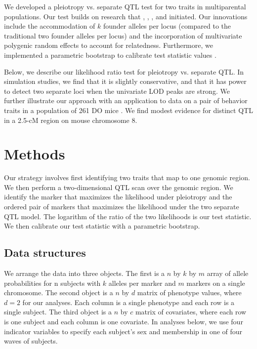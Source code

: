 \documentclass[12pt,twoside, lineno]{gsajnl}
\begin{document}
We developed a pleiotropy vs. separate QTL test for two traits in multiparental populations. Our test builds on research that \citet{jiang1995multiple}, \citet{knott2000multitrait}, \citet{tian2016dissection}, and \citet{zhou2014efficient} initiated. Our innovations include the accommodation of $k$ founder alleles per locus (compared to the traditional two founder alleles per locus) and the incorporation of multivariate polygenic random effects to account for relatedness. Furthermore, we implemented a parametric bootstrap to calibrate test statistic values \citep{efron1979,tian2016dissection}.

Below, we describe our likelihood ratio test for pleiotropy vs.
separate QTL. In simulation studies, we find that it is slightly
conservative, and that it has power to detect two separate loci when
the univariate LOD peaks are strong. We further illustrate our
approach with an application to data on a pair of behavior traits in
a population of 261 DO mice \citep{logan2013high,recla2014precise}.
We find modest evidence for distinct QTL in a 2.5-cM region on mouse
chromosome 8.


\section{Methods}
\label{sec:materials:methods}

Our strategy involves first identifying two traits that map to one genomic region. We then perform a two-dimensional QTL scan over the genomic region. We identify the marker that maximizes the likelihood under pleiotropy and the ordered pair of markers that maximizes the likelihood under the two separate QTL model. The logarithm of the ratio of the two likelihoods is our test statistic. We then calibrate our test statistic with a parametric bootstrap.

\subsection{Data structures}

We arrange the data into three objects. The first is a $n$ by $k$ by $m$ array of allele probabilities for n subjects with $k$ alleles per marker and $m$ markers on a single chromosome. The second object is a $n$ by $d$ matrix of phenotype values, where $d = 2$ for our analyses. Each column is a single phenotype and each row is a single subject. The third object is a $n$ by $c$ matrix of covariates, where each row is one subject and each column is one covariate. In analyses below, we use four indicator variables to specify each subject's sex and membership in one of four waves of subjects.
\end{document}
